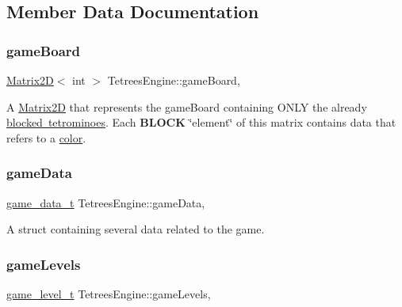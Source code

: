 \subsection{Member Data Documentation}
\mbox{\label{classTetreesEngine_a37d082a7816d6731b2703dd6d1a1cb97}} 
\subsubsection{\texorpdfstring{game\+Board}{gameBoard}}
{\footnotesize\ttfamily \mbox{\hyperlink{classMatrix2D}{Matrix2D}}$<$ int $>$ Tetrees\+Engine\+::game\+Board\hspace{0.3cm}{\ttfamily [static]}, {\ttfamily [private]}}

A \mbox{\hyperlink{classMatrix2D}{Matrix2D}} that represents the game\+Board containing O\+N\+LY the already \mbox{\hyperlink{classTetreesEngine_a0978ef1f287f00a8ed5a4af2d680b943}{blocked tetrominoes}}. Each {\bfseries B\+L\+O\+CK} \char`\"{}element\char`\"{} of this matrix contains data that refers to a \mbox{\hyperlink{TetreesDefs_8hpp_a8ba5fbce2446135735693ab60c896bbd}{color}}. \mbox{\label{classTetreesEngine_afa356b8bb38e8918400e7175d6fbbd2e}} 
\subsubsection{\texorpdfstring{game\+Data}{gameData}}
{\footnotesize\ttfamily \mbox{\hyperlink{structgame__data__t}{game\+\_\+data\+\_\+t}} Tetrees\+Engine\+::game\+Data\hspace{0.3cm}{\ttfamily [static]}, {\ttfamily [private]}}

A struct containing several data related to the game. \mbox{\label{classTetreesEngine_a03ea87d7cefe7b216977c9123fc6ef60}} 
\subsubsection{\texorpdfstring{game\+Levels}{gameLevels}}
{\footnotesize\ttfamily \mbox{\hyperlink{structgame__level__t}{game\+\_\+level\+\_\+t}} Tetrees\+Engine\+::game\+Levels\hspace{0.3cm}{\ttfamily [static]}, {\ttfamily [private]}}

